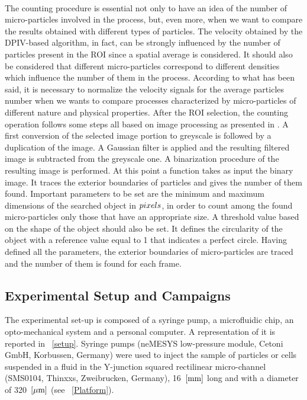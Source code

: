 \documentclass[journal]{IEEEtran}
\theoremstyle{definition}
\theoremstyle{remark}
\begin{document}
\\The counting procedure is essential not only to have an idea of the number of micro-particles involved in the process, but, even more, when we want to compare the results obtained with different types of particles. The velocity obtained by the DPIV-based algorithm, in fact, can be strongly influenced by the number of particles present in the ROI since a spatial average is considered. It should also be considered that different micro-particles correspond to different densities which influence the number of them in the process. According to what has been said, it is necessary to normalize the velocity signals for the average particles number when we wants to compare processes characterized by micro-particles of different nature and physical properties.
After the ROI selection, the counting operation follows some steps all based on image processing as presented in . A first conversion of the selected image portion to greyscale is followed by a duplication of the image. A Gaussian filter is applied and the resulting filtered image is subtracted from the greyscale one. A binarization procedure of the resulting image is performed.
At this point a function takes as input the binary image. It traces the exterior boundaries of particles and gives the number of them found.
Important parameters to be set are the minimum and maximum dimensions of the searched object in $pixels$, in order to count among the found micro-particles only those that have an appropriate size. A threshold value based on the shape of the object should also be set. It defines the circularity of the object with a reference value equal to 1 that indicates a perfect circle.
Having defined all the parameters, the exterior boundaries of micro-particles are traced and the number of them is found for each frame.

\subsection{Experimental Setup and Campaigns}\label{sec:setup}

The experimental set-up is composed of a syringe pump, a microfluidic chip, an opto-mechanical system and a personal computer. A representation of it is reported in ~\fig\ref{setup}. Syringe pumps (neMESYS low-pressure module, Cetoni GmbH,
Korbussen, Germany) were used to inject the sample of particles or cells suspended in a fluid in the Y-junction squared rectilinear micro-channel (SMS0104, Thinxxs, Zweibrucken, Germany), 16~$[\rm mm]$ long and with a diameter of 320~$[\rm\mu m]$ (see ~\fig\ref{Platform}).
\end{document}

